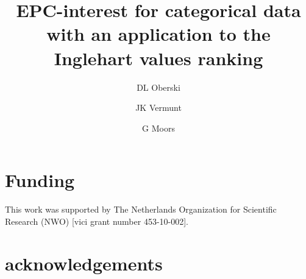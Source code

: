 \documentclass[letterpaper,12pt]{article}
\title{EPC-interest for categorical data with an application to the Inglehart values ranking
}
\date{Department of Methodology and Statistics\\Tilburg University, The Netherlands\\
\raggedright\vspace{12pt}\footnotesize
Address: \\
Room P 1105, 
PO Box 90153, 5000 LE Tilburg\\
Phone:	+31 13 466 2959\\
Email: 	d.oberski@tilburguniversity.edu\\
}
\author{DL Oberski \and JK Vermunt \and G Moors}
\begin{document}
\maketitle


\vspace{-28pt}
\section*{Funding}

This work was supported by The Netherlands Organization for Scientific Research (NWO) [vici grant number 453-10-002].

\section*{acknowledgements}
\end{document}
